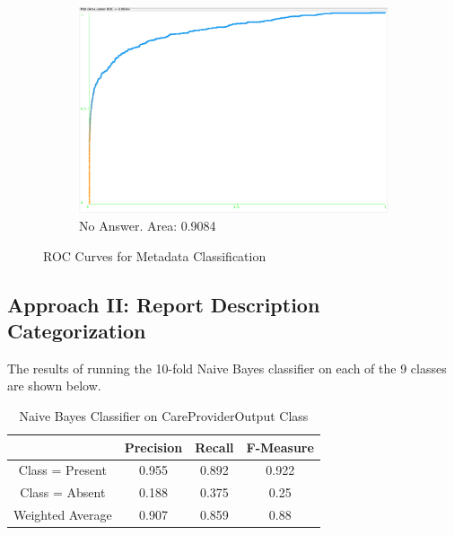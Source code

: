 \documentclass[11pt, notitlepage,abstracton,oneside]{article}   	%
\begin{document}
\begin{figure}[H]
\begin{subfigure}[b]{0.4\textwidth}
        \includegraphics[width=\textwidth]{figures/no-answer}
        \caption{No Answer. Area: 0.9084}
        \label{fig:no-figure}
    \end{subfigure}          
    \caption{ROC Curves for Metadata Classification}
    \label{fig:ROC Curves}
\end{figure}

\subsection{Approach II: Report Description Categorization}

The results of running the 10-fold Naive Bayes classifier on each of the 9 classes are shown below.

\begin{table}[H]
    \caption{Naive Bayes Classifier on CareProviderOutput Class}
        \begin{center}
        \begin{tabular}{|c|c|c|c|}
            \hline
            & Precision & Recall & F-Measure \\ \hline
            Class = Present & 0.955 & 0.892 & 0.922 \\ \hline
            Class = Absent & 0.188 & 0.375 & 0.25 \\ \hline
            Weighted Average & 0.907 & 0.859 & 0.88 \\ \hline
        \end{tabular}
        \end{center}
    \label{default}
\end{table}%
\end{document}
